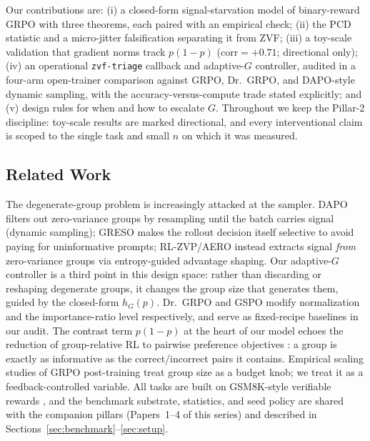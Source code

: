 Our contributions are:
(i) a closed-form signal-starvation model of binary-reward GRPO with three
theorems, each paired with an empirical check;
(ii) the PCD statistic and a micro-jitter falsification separating it from
ZVF;
(iii) a toy-scale validation that gradient norms track $p(1-p)$
($\mathrm{corr} = +0.71$; directional only);
(iv) an operational \texttt{zvf-triage} callback and adaptive-$G$ controller,
audited in a four-arm open-trainer comparison against GRPO, Dr.~GRPO, and
DAPO-style dynamic sampling, with the accuracy-versus-compute trade stated
explicitly; and
(v) design rules for when and how to escalate $G$.
Throughout we keep the Pillar-2 discipline: toy-scale results are marked
directional, and every interventional claim is scoped to the single task and
small $n$ on which it was measured.

\subsection{Related Work}
\label{sec:p7-related}
The degenerate-group problem is increasingly attacked at the sampler. DAPO
\citep{yu2025dapo} filters out zero-variance groups by resampling until the
batch carries signal (dynamic sampling); GRESO \citep{zhang2026greso} makes
the rollout decision itself selective to avoid paying for uninformative
prompts; RL-ZVP/AERO \citep{le2025rlzvp} instead extracts signal \emph{from}
zero-variance groups via entropy-guided advantage shaping. Our adaptive-$G$
controller is a third point in this design space: rather than discarding or
reshaping degenerate groups, it changes the group size that generates them,
guided by the closed-form $h_G(p)$. Dr.~GRPO \citep{tong2025drgrpo} and GSPO
\citep{qwen2025gspo} modify normalization and the importance-ratio level
respectively, and serve as fixed-recipe baselines in our audit. The
contrast term $p(1-p)$ at the heart of our model echoes the reduction of
group-relative RL to pairwise preference objectives
\citep{wu2025grpo_dpo, rafailov2024direct}: a group is exactly as informative
as the correct/incorrect pairs it contains. Empirical scaling studies of
GRPO post-training \citep{tan2025scalingrl} treat group size as a budget
knob; we treat it as a feedback-controlled variable. All tasks are built on
GSM8K-style verifiable rewards \citep{cobbe2021training}, and the benchmark
substrate, statistics, and seed policy are shared with the companion pillars
(Papers~1--4 of this series) and described in
Sections~\ref{sec:benchmark}--\ref{sec:setup}.
